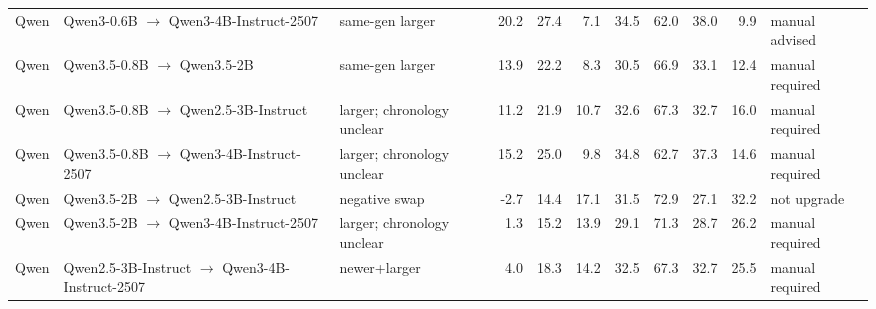 \begin{tabular}{lllrrrrrrrl}
Qwen & Qwen3-0.6B $\rightarrow$ Qwen3-4B-Instruct-2507 & same-gen larger & 20.2 & 27.4 & 7.1 & 34.5 & 62.0 & 38.0 & 9.9 & manual advised \\
Qwen & Qwen3.5-0.8B $\rightarrow$ Qwen3.5-2B & same-gen larger & 13.9 & 22.2 & 8.3 & 30.5 & 66.9 & 33.1 & 12.4 & manual required \\
Qwen & Qwen3.5-0.8B $\rightarrow$ Qwen2.5-3B-Instruct & larger; chronology unclear & 11.2 & 21.9 & 10.7 & 32.6 & 67.3 & 32.7 & 16.0 & manual required \\
Qwen & Qwen3.5-0.8B $\rightarrow$ Qwen3-4B-Instruct-2507 & larger; chronology unclear & 15.2 & 25.0 & 9.8 & 34.8 & 62.7 & 37.3 & 14.6 & manual required \\
Qwen & Qwen3.5-2B $\rightarrow$ Qwen2.5-3B-Instruct & negative swap & -2.7 & 14.4 & 17.1 & 31.5 & 72.9 & 27.1 & 32.2 & not upgrade \\
Qwen & Qwen3.5-2B $\rightarrow$ Qwen3-4B-Instruct-2507 & larger; chronology unclear & 1.3 & 15.2 & 13.9 & 29.1 & 71.3 & 28.7 & 26.2 & manual required \\
Qwen & Qwen2.5-3B-Instruct $\rightarrow$ Qwen3-4B-Instruct-2507 & newer+larger & 4.0 & 18.3 & 14.2 & 32.5 & 67.3 & 32.7 & 25.5 & manual required \\
\bottomrule
\end{tabular}
